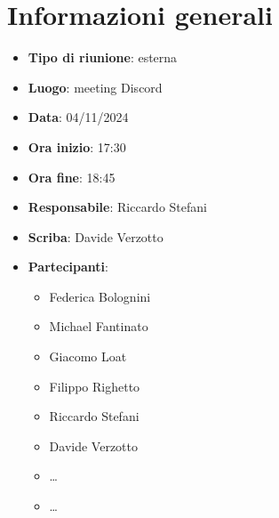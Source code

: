 


\section{Informazioni generali}

\begin{itemize}
    \item \textbf{Tipo di riunione}: esterna
    \item \textbf{Luogo}: meeting Discord
    \item \textbf{Data}: 04/11/2024
    \item \textbf{Ora inizio}: 17:30
    \item \textbf{Ora fine}: 18:45
    \item \textbf{Responsabile}: Riccardo Stefani
    \item \textbf{Scriba}: Davide Verzotto
    \item \textbf{Partecipanti}:
    \begin{itemize}
        \item Federica Bolognini
        \item Michael Fantinato
        \item Giacomo Loat
        \item Filippo Righetto
        \item Riccardo Stefani
        \item Davide Verzotto
        \item \dots
        \item \dots
    \end{itemize}
\end{itemize}
